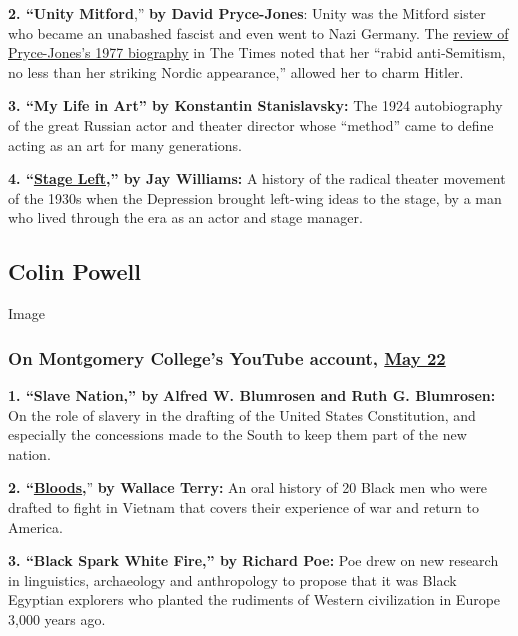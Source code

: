\textbf{2. ``Unity Mitford},'' \textbf{by David Pryce-Jones}: Unity was
the Mitford sister who became an unabashed fascist and even went to Nazi
Germany. The
\href{https://www.nytimes.com/1977/05/08/archives/swastikas-in-retaliation-unity-mitford-swastikas.html}{review
of Pryce-Jones's 1977 biography} in The Times noted that her ``rabid
anti‐Semitism, no less than her striking Nordic appearance,'' allowed
her to charm Hitler.

\textbf{3. ``My Life in Art'' by Konstantin Stanislavsky:} The 1924
autobiography of the great Russian actor and theater director whose
``method'' came to define acting as an art for many generations.

\textbf{4.
``\href{https://www.nytimes.com/1974/03/10/archives/stage-left-when-the-message-was-the-message-in-the-american-theater.html}{Stage
Left},'' by Jay Williams:} A history of the radical theater movement of
the 1930s when the Depression brought left-wing ideas to the stage, by a
man who lived through the era as an actor and stage manager.

\hypertarget{colin-powell}{%
\subsection{Colin Powell}\label{colin-powell}}

Image

\hypertarget{on-montgomery-colleges-youtube-account-may-22}{%
\subsubsection{\texorpdfstring{On Montgomery College's YouTube account,
\href{https://www.youtube.com/watch?v=Z5ZSRmj_Jmc\&list=PL32wEiPova8LmwOHqJRXSlY0gqyqfB2EK\&index=4\&t=0s}{May
22}}{On Montgomery College's YouTube account, May 22}}\label{on-montgomery-colleges-youtube-account-may-22}}

\textbf{1. ``Slave Nation,'' by} \textbf{Alfred W. Blumrosen and Ruth G.
Blumrosen:} On the role of slavery in the drafting of the United States
Constitution, and especially the concessions made to the South to keep
them part of the new nation.

\textbf{2.
``\href{https://www.nytimes.com/1984/08/27/books/books-of-the-times-160149.html}{Bloods},}''
\textbf{by Wallace Terry:} An oral history of 20 Black men who were
drafted to fight in Vietnam that covers their experience of war and
return to America.

\textbf{3. ``Black Spark White Fire,'' by Richard Poe:} Poe drew on new
research in linguistics, archaeology and anthropology to propose that it
was Black Egyptian explorers who planted the rudiments of Western
civilization in Europe 3,000 years ago.

